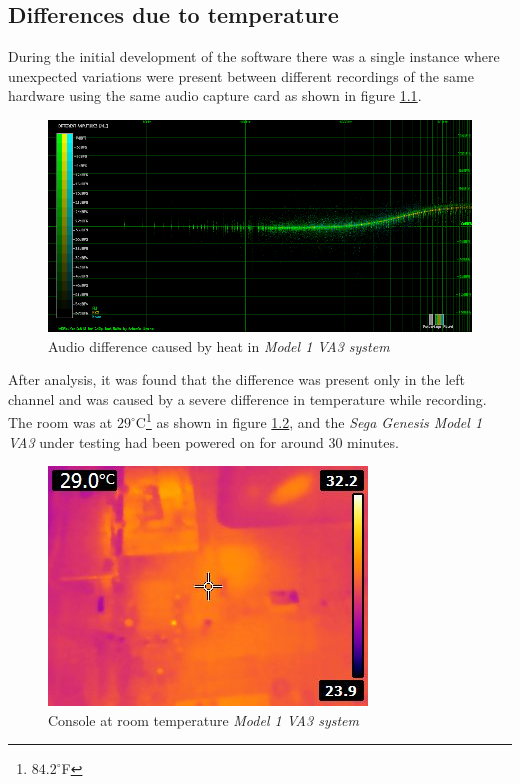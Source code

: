\documentclass[10pt,a4paper]{report}
\begin{document}
\begin{appendices}
\chapter{Differences due to temperature}

During the initial development of the software there was a single instance where unexpected variations were present between different recordings of the same hardware using the same audio capture card as shown in figure \ref{fig:heatdiff}.

\begin{figure}[H]
	\centering
	\includegraphics[width=1.0\linewidth]{images/heat/0-plotheat.png}
	\caption[Heat Difference]{Audio difference caused by heat in \textit{Model 1 VA3 system}}
	\label{fig:heatdiff}
\end{figure}

After analysis, it was found that the difference was present only in the left channel and was caused by a severe difference in temperature while recording. The room was at $29^\circ$C\footnote{$84.2^\circ$F} as shown in figure \ref{fig:heatroomtemp}, and the \textit{Sega Genesis Model 1 VA3} under testing had been powered on for around 30 minutes.

\begin{figure}[H]
	\centering
	\includegraphics[width=0.4\linewidth]{images/heat/1-roomtemp.jpg}
	\caption[Room temperature]{Console at room temperature \textit{Model 1 VA3 system}}
	\label{fig:heatroomtemp}
\end{figure}


\end{appendices}
\end{document}
